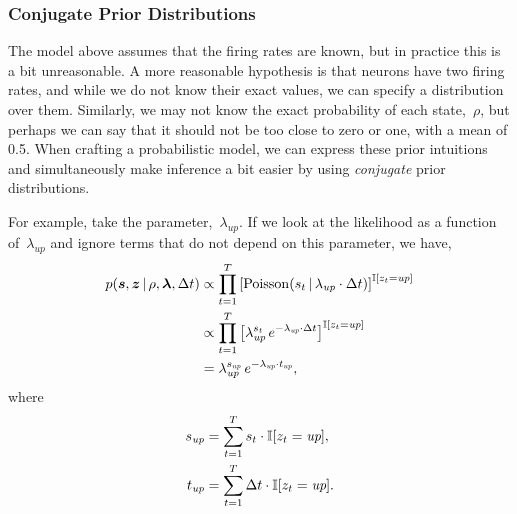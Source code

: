 \subsubsection{Conjugate Prior Distributions}
The model above assumes that the firing rates are known, but in practice 
this is a bit unreasonable. A more reasonable hypothesis is that neurons have 
two firing rates, and while we do not know their exact values, we can 
specify a distribution over them. Similarly, we may not know 
the exact probability of each state,~$\rho$, but perhaps we can say
that it should not be too close to zero or one, with a mean of 0.5.
When crafting a probabilistic model, we can express these prior
intuitions and simultaneously make inference a bit easier by using
\emph{conjugate} prior distributions.


For example,
take the parameter,~$\lambda_{\textit{up}}$. If we look at the
likelihood as a function of~$\lambda_{\textit{up}}$ and ignore
terms that do not depend on this parameter, we have,
\begin{align}
  p(\boldsymbol{s}, \boldsymbol{z} \,|\, \rho, \boldsymbol{\lambda}, \Delta t)
  &\propto \prod_{t=1}^T \left[
    \mathrm{Poisson}(s_t \,|\, \lambda_{\textit{up}} \cdot \Delta t)
    \right]^{\mathbb{I}[z_t = \textit{up}]} \\
  &\propto \prod_{t=1}^T \left[
    \lambda_{\textit{up}}^{s_t} \,
    e^{-\lambda_{\textit{up}} \cdot \Delta t}
    \right]^{\mathbb{I}[z_t = \textit{up}]} \\
  &=
  \lambda_{\textit{up}}^{s_{\textit{up}}} \,
  e^{-\lambda_{\textit{up}} \cdot t_{\textit{up}}},
\end{align}
where
\begin{align}
  s_{\textit{up}} &= \sum_{t=1}^T s_t \cdot \mathbb{I}[z_t = \textit{up}], \\
  t_{\textit{up}} &= \sum_{t=1}^T \Delta t \cdot \mathbb{I}[z_t = \textit{up}].
\end{align}

